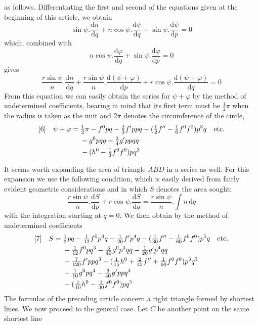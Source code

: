 %
as follows. Differentiating the first and second of the equations given at the beginning of this article, we obtain
\[
\sin\psi\mathord{.}\frac{\mathrm{d}n}{\mathrm{d}q}+n\cos\psi\mathord{.}\frac{\mathrm{d}\psi}{\mathrm{d}q}+\sin\psi\mathord{.}\frac{\mathrm{d}\psi}{\mathrm{d}p}=0
\]
which, combined with
\[
n\cos\psi\mathord{.}\frac{\mathrm{d}\varphi}{\mathrm{d}q}+\sin\psi\mathord{.}\frac{\mathrm{d}\varphi}{\mathrm{d}p}=0
\]
gives
\[
\frac{r\sin\psi}{n}\mathord{.}\frac{\mathrm{d}n}{\mathrm{d}q}+\frac{r\sin\psi}{n}\mathord{.}\frac{\mathrm{d}(\psi+\varphi)}{\mathrm{d}p}+r\cos\psi\mathord{.}\frac{\mathrm{d}(\psi+\varphi)}{\mathrm{d}q}=0
\]
From this equation we can easily obtain the series for \(\psi+\varphi\) by the method of undetermined coefficients, bearing in mind that its first term must be \(\tfrac{1}{2}\pi\) when the radius is taken as the unit and \(2\pi\) denotes the circumference of the circle,
\[
\begin{aligned}
\relax[6]\quad\psi+\varphi={}&\tfrac{1}{2}\pi-f^0pq-\tfrac{2}{3}f'ppq-(\tfrac{1}{2}f''-\tfrac{1}{6}f^0f^0)p^3q\quad\text{etc.}\\
&-g^0pqq-\tfrac{3}{4}g'ppqq\\
&-(h^0-\tfrac{1}{3}f^0f^0)pq^3
\end{aligned}
\]

It seems worth expanding the area of triangle \(ABD\) in a series as well. For this expansion we use the following condition, which is easily derived from fairly evident geometric considerations and in which \(S\) denotes the area sought:
\[
\frac{r\sin\psi}{n}\mathord{.}\frac{\mathrm{d}S}{\mathrm{d}p}+r\cos\psi\mathord{.}\frac{\mathrm{d}S}{\mathrm{d}q}=\frac{r\sin\psi}{n}\mathord{.}\int n\,\mathrm{d}q
\]
with the integration starting at \(q=0\). We then obtain by the method of undetermined coefficients
\[
\begin{aligned}
\relax[7]\quad S={}&\tfrac{1}{2}pq-\tfrac{1}{12}f^0p^3q-\tfrac{1}{20}f'p^4q-(\tfrac{1}{30}f''-\tfrac{1}{60}f^0f^0)p^5q\quad\text{etc.}\\
&-\tfrac{1}{12}f^0pq^3-\tfrac{3}{40}g^0p^3qq-\tfrac{1}{20}g'p^4qq\\
&-\tfrac{7}{120}f'ppq^3-(\tfrac{1}{15}h^0+\tfrac{2}{45}f''+\tfrac{1}{60}f^0f^0)p^3q^3\\
&-\tfrac{1}{10}g^0pq^4-\tfrac{3}{40}g'ppq^4\\
&-(\tfrac{1}{10}h^0-\tfrac{1}{30}f^0f^0)pq^5
\end{aligned}
\]
The formulas of the preceding article concern a right triangle formed by shortest lines. We now proceed to the general case. Let \(C\) be another point on the same shortest line
